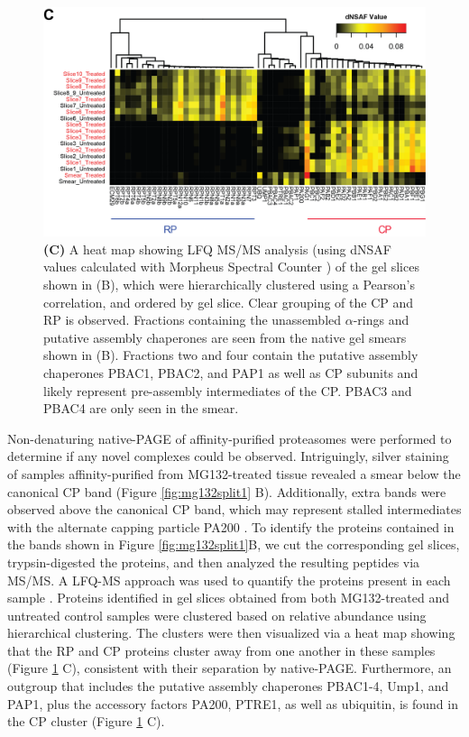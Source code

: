 \begin{figure}
	\ContinuedFloat
	\centering
	\includegraphics[width=\columnwidth]{Proteasome/mg132split2.png}
	{\textbf{(C)} A heat map showing LFQ MS/MS analysis (using dNSAF values calculated with Morpheus Spectral Counter \citep{gemperline16}) of the gel slices shown in (B), which were hierarchically clustered using a Pearson's correlation, and ordered by gel slice. Clear grouping of the CP and RP is observed. Fractions containing the unassembled $\alpha$-rings and putative assembly chaperones are seen from the native gel smears shown in (B). Fractions two and four contain the putative assembly chaperones PBAC1, PBAC2, and PAP1 as well as CP subunits and likely represent pre-assembly intermediates of the CP. PBAC3 and PBAC4 are only seen in the smear.}
	\label{fig:mg132split2}
\end{figure}

Non-denaturing native-PAGE of affinity-purified proteasomes were performed to determine if any novel complexes could be observed. Intriguingly, silver staining of samples affinity-purified from MG132-treated tissue revealed a smear below the canonical CP band (Figure \ref{fig:mg132split1} B). Additionally, extra bands were observed above the canonical CP band, which may represent stalled intermediates with the alternate capping particle PA200 \citep{li07}. To identify the proteins contained in the bands shown in Figure \ref{fig:mg132split1}B, we cut the corresponding gel slices, trypsin-digested the proteins, and then analyzed the resulting peptides via MS/MS. A LFQ-MS approach was used to quantify the proteins present in each sample \citep{gemperline16}. Proteins identified in gel slices obtained from both MG132-treated and untreated control samples were clustered based on relative abundance using hierarchical clustering. The clusters were then visualized via a heat map showing that the RP and CP proteins cluster away from one another in these samples (Figure \ref{fig:mg132split2} C), consistent with their separation by native-PAGE. Furthermore, an outgroup that includes the putative assembly chaperones PBAC1-4, Ump1, and PAP1, plus the accessory factors PA200, PTRE1, as well as ubiquitin, is found in the CP cluster (Figure \ref{fig:mg132split2} C).


